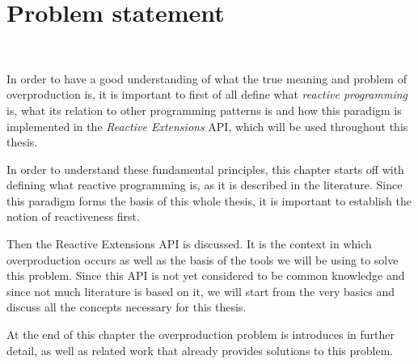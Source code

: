 \chapter{Problem statement}

\\

In order to have a good understanding of what the true meaning and problem of overproduction is, it is important to first of all define what \textit{reactive programming} is, what its relation to other programming patterns is and how this paradigm is implemented in the \textit{Reactive Extensions} API, which will be used throughout this thesis.

In order to understand these fundamental principles, this chapter starts off with defining what reactive programming is, as it is described in the literature. Since this paradigm forms the basis of this whole thesis, it is important to establish the notion of reactiveness first.

Then the Reactive Extensions API is discussed. It is the context in which overproduction occurs as well as the basis of the tools we will be using to solve this problem. Since this API is not yet considered to be common knowledge and since not much literature is based on it, we will start from the very basics and discuss all the concepts necessary for this thesis.

At the end of this chapter the overproduction problem is introduces in further detail, as well as related work that already provides solutions to this problem.






